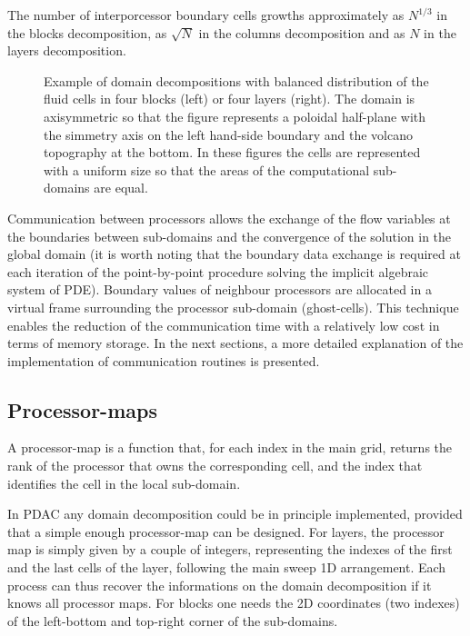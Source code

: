 The number of interporcessor boundary cells growths approximately as $N^{1/3}$ in the blocks decomposition, as $\sqrt{N}$ in the columns
decomposition and as $N$ in the layers decomposition.\\

%
\begin{figure}[htb]
\setlength{\unitlength}{1mm}
\begin{center}
\begin{minipage}{6cm}
\centerline{}
\end{minipage}
\begin{minipage}{6cm}
\centerline{}
\end{minipage}
\end{center}
\caption{Example of domain decompositions with balanced distribution of
the fluid cells in four blocks (left) or four layers (right).
The domain is axisymmetric so that the figure represents a poloidal
half-plane with the simmetry axis on the left hand-side boundary and
the volcano topography at the bottom. In these figures the cells are represented
with a uniform size so that the areas of the computational sub-domains
are equal.\label{fig:Ves_part}}
\end{figure}
%

Communication between processors allows the exchange of the flow variables
at the boundaries between sub-domains and the convergence of the solution
in the global domain (it is worth noting that the
boundary data exchange is required at each iteration of the point-by-point
procedure solving the implicit algebraic system of PDE).
Boundary values of neighbour processors are allocated in a virtual
frame surrounding the processor sub-domain (ghost-cells). This technique
enables the reduction of the communication time with a relatively low cost
in terms of memory storage.
In the next sections, a more detailed explanation of the implementation of communication
routines is presented.
%
\subsection{Processor-maps}
A processor-map is a function that, for each index in the main grid, returns the rank
of the processor that owns the corresponding cell, and the index that identifies the
cell in the local sub-domain.

In PDAC any domain decomposition could be in principle implemented, provided that a 
simple enough processor-map can be designed.
For layers, the processor map is simply given by a couple of integers,
representing the indexes of the first and the last cells of the layer, following
the main sweep 1D arrangement.  Each process can thus recover
the informations on the domain decomposition if it knows all processor maps.
For blocks one needs the 2D coordinates (two indexes) of the left-bottom and
top-right corner of the sub-domains.

